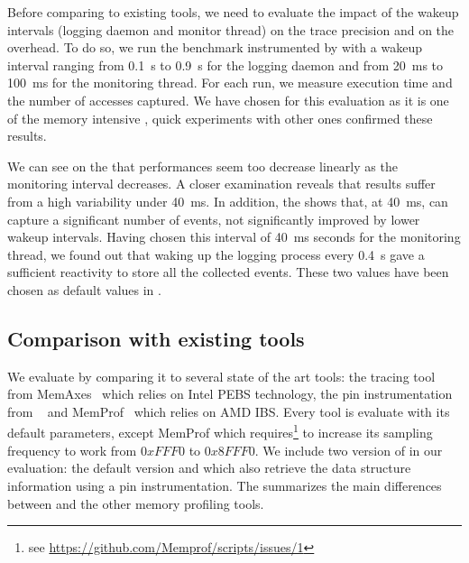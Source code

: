 Before comparing \Moca to existing tools, we need to evaluate the impact of
the wakeup intervals (logging daemon and monitor thread) on the trace
precision and on the overhead. To do so, we run the \IS benchmark instrumented by \Moca with
a wakeup interval ranging from \SI{0.1}{s} to  \SI{0.9}{s} for the logging daemon and from \SI{20}{ms} to
\SI{100}{ms} for the monitoring thread. For each run, we measure \IS execution time and the number of
accesses captured. We have chosen \IS for this evaluation as it is one of the memory intensive \NPB,
quick experiments with other ones confirmed these results.


We can see on the  that performances seem too decrease linearly
as the monitoring interval decreases. A closer examination reveals that results
suffer from a high variability under \SI{40}{ms}. 
In addition, the  shows
that, at \SI{40}{ms}, \Moca can capture a significant number of events, not significantly improved
by lower wakeup intervals. Having chosen this interval of \SI{40}{ms} seconds for the monitoring thread,
we found out that waking up the logging process every \SI{0.4}{s} gave a sufficient reactivity to store
all the collected events.
These two values have been chosen as default values in \Moca.

\subsection{Comparison with existing tools}
\label{sec:expe-ovh}

We evaluate \Moca by comparing it to several state of the art tools: \Mitos
the tracing tool from MemAxes~\cite{Gimenez14Dissecting} which relies on Intel
PEBS technology, the pin instrumentation from
\TABARNAC~\cite{Beniamine15TABARNAC} and MemProf~\cite{Lachaize12MemProf}
which relies on AMD IBS. Every tool is evaluate with its default parameters,
except MemProf which requires\footnote{see
    \url{https://github.com/Memprof/scripts/issues/1}} to increase its
    sampling frequency to work from $0xFFF0$ to $0x8FFF0$.
We include two version of \Moca in our evaluation: the default version and
\MocaPin which also retrieve the data structure information using a pin
instrumentation.
The  summarizes the main differences between \Moca and the
other memory profiling tools.

